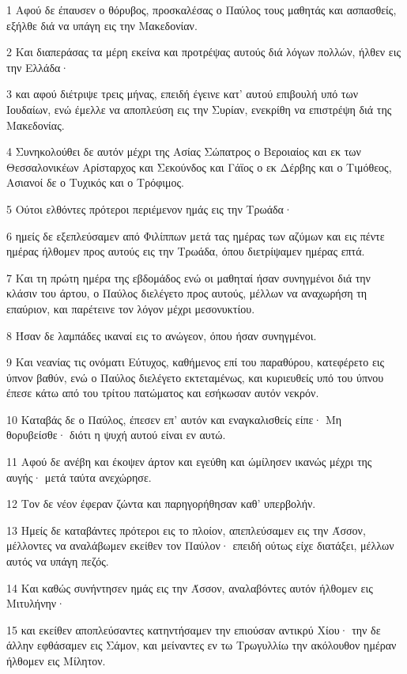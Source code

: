 \par 1 Αφού δε έπαυσεν ο θόρυβος, προσκαλέσας ο Παύλος τους μαθητάς και ασπασθείς, εξήλθε διά να υπάγη εις την Μακεδονίαν.
\par 2 Και διαπεράσας τα μέρη εκείνα και προτρέψας αυτούς διά λόγων πολλών, ήλθεν εις την Ελλάδα·
\par 3 και αφού διέτριψε τρεις μήνας, επειδή έγεινε κατ' αυτού επιβουλή υπό των Ιουδαίων, ενώ έμελλε να αποπλεύση εις την Συρίαν, ενεκρίθη να επιστρέψη διά της Μακεδονίας.
\par 4 Συνηκολούθει δε αυτόν μέχρι της Ασίας Σώπατρος ο Βεροιαίος και εκ των Θεσσαλονικέων Αρίσταρχος και Σεκούνδος και Γάϊος ο εκ Δέρβης και ο Τιμόθεος, Ασιανοί δε ο Τυχικός και ο Τρόφιμος.
\par 5 Ούτοι ελθόντες πρότεροι περιέμενον ημάς εις την Τρωάδα·
\par 6 ημείς δε εξεπλεύσαμεν από Φιλίππων μετά τας ημέρας των αζύμων και εις πέντε ημέρας ήλθομεν προς αυτούς εις την Τρωάδα, όπου διετρίψαμεν ημέρας επτά.
\par 7 Και τη πρώτη ημέρα της εβδομάδος ενώ οι μαθηταί ήσαν συνηγμένοι διά την κλάσιν του άρτου, ο Παύλος διελέγετο προς αυτούς, μέλλων να αναχωρήση τη επαύριον, και παρέτεινε τον λόγον μέχρι μεσονυκτίου.
\par 8 Ήσαν δε λαμπάδες ικαναί εις το ανώγεον, όπου ήσαν συνηγμένοι.
\par 9 Και νεανίας τις ονόματι Εύτυχος, καθήμενος επί του παραθύρου, κατεφέρετο εις ύπνον βαθύν, ενώ ο Παύλος διελέγετο εκτεταμένως, και κυριευθείς υπό του ύπνου έπεσε κάτω από του τρίτου πατώματος και εσήκωσαν αυτόν νεκρόν.
\par 10 Καταβάς δε ο Παύλος, έπεσεν επ' αυτόν και εναγκαλισθείς είπε· Μη θορυβείσθε· διότι η ψυχή αυτού είναι εν αυτώ.
\par 11 Αφού δε ανέβη και έκοψεν άρτον και εγεύθη και ώμίλησεν ικανώς μέχρι της αυγής· μετά ταύτα ανεχώρησε.
\par 12 Τον δε νέον έφεραν ζώντα και παρηγορήθησαν καθ' υπερβολήν.
\par 13 Ημείς δε καταβάντες πρότεροι εις το πλοίον, απεπλεύσαμεν εις την Άσσον, μέλλοντες να αναλάβωμεν εκείθεν τον Παύλον· επειδή ούτως είχε διατάξει, μέλλων αυτός να υπάγη πεζός.
\par 14 Και καθώς συνήντησεν ημάς εις την Άσσον, αναλαβόντες αυτόν ήλθομεν εις Μιτυλήνην·
\par 15 και εκείθεν αποπλεύσαντες κατηντήσαμεν την επιούσαν αντικρύ Χίου· την δε άλλην εφθάσαμεν εις Σάμον, και μείναντες εν τω Τρωγυλλίω την ακόλουθον ημέραν ήλθομεν εις Μίλητον.
